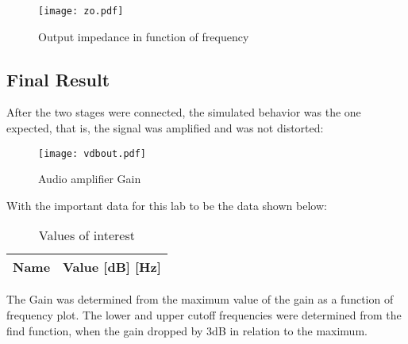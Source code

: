 \vspace{-0.9in}
\begin{figure}[H] \centering
\texttt{[image: zo.pdf]}
\caption{Output impedance in function of frequency}
\label{fig:dev3}
\end{figure}

\newpage
\subsection{Final Result}

After the two stages were connected, the simulated behavior was the one expected, that is, the signal was amplified and was not distorted:



\begin{figure}[H] \centering
\texttt{[image: vdbout.pdf]}
\caption{Audio amplifier Gain}
\label{fig:dev4}
\end{figure}

With the important data for this lab to be the data shown below:


\vspace{0.1in}
\begin{table}[ht]
  \centering
  \begin{tabular}{|l|r|}
    \hline    
    {\bf Name} & {\bf Value [dB] [Hz]} \\ \hline
    
  \end{tabular}
  \caption{Values of interest}
  \label{tab:r4}
\end{table}
\vspace{0.3in}

The Gain was determined from the maximum value of the gain as a function of frequency plot. The lower and upper cutoff frequencies were determined from the find function, when the gain dropped by 3dB in relation to the maximum.

\newpage


